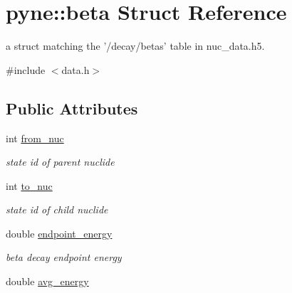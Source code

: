 \hypertarget{structpyne_1_1beta}{\section{pyne\-:\-:beta Struct Reference}
\label{structpyne_1_1beta}
}


a struct matching the '/decay/betas' table in nuc\-\_\-data.\-h5.  




{\ttfamily \#include $<$data.\-h$>$}

\subsection*{Public Attributes}
\begin{DoxyCompactItemize}
\item 
\hypertarget{structpyne_1_1beta_ad312f7cc9b8f0096aa1b797f28e10390}{int \hyperlink{structpyne_1_1beta_ad312f7cc9b8f0096aa1b797f28e10390}{from\-\_\-nuc}}\label{structpyne_1_1beta_ad312f7cc9b8f0096aa1b797f28e10390}

\begin{DoxyCompactList}\small\item\em state id of parent nuclide \end{DoxyCompactList}\item 
\hypertarget{structpyne_1_1beta_a359665983e92b3d729c6996faae54a18}{int \hyperlink{structpyne_1_1beta_a359665983e92b3d729c6996faae54a18}{to\-\_\-nuc}}\label{structpyne_1_1beta_a359665983e92b3d729c6996faae54a18}

\begin{DoxyCompactList}\small\item\em state id of child nuclide \end{DoxyCompactList}\item 
\hypertarget{structpyne_1_1beta_a1d23daf403d723e17a21070ebba1aa4f}{double \hyperlink{structpyne_1_1beta_a1d23daf403d723e17a21070ebba1aa4f}{endpoint\-\_\-energy}}\label{structpyne_1_1beta_a1d23daf403d723e17a21070ebba1aa4f}

\begin{DoxyCompactList}\small\item\em beta decay endpoint energy \end{DoxyCompactList}\item 
\hypertarget{structpyne_1_1beta_aef1da93efa75bfbb8c77604b8c24ba04}{double \hyperlink{structpyne_1_1beta_aef1da93efa75bfbb8c77604b8c24ba04}{avg\-\_\-energy}}\label{structpyne_1_1beta_aef1da93efa75bfbb8c77604b8c24ba04}


\end{DoxyCompactItemize}
